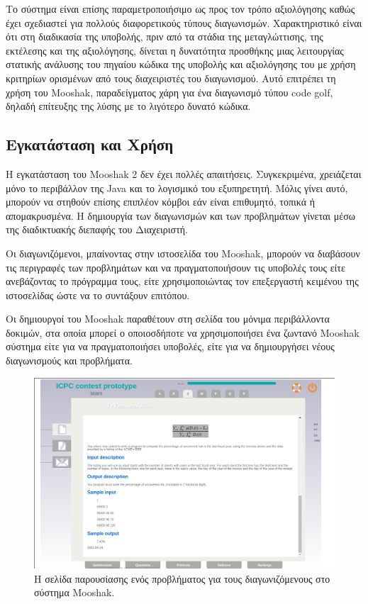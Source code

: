 \documentclass[diploma]{softlab-thesis}
\begin{document}
\bigskip

Το σύστημα είναι επίσης παραμετροποιήσιμο ως προς τον τρόπο αξιολόγησης καθώς
έχει σχεδιαστεί για πολλούς διαφορετικούς τύπους διαγωνισμών. Χαρακτηριστικό
είναι ότι στη διαδικασία της υποβολής, πριν από τα στάδια της μεταγλώττισης,
της εκτέλεσης και της αξιολόγησης, δίνεται η δυνατότητα προσθήκης μιας
λειτουργίας στατικής ανάλυσης του πηγαίου κώδικα της υποβολής και αξιολόγησης
του με χρήση κριτηρίων ορισμένων από τους διαχειριστές του διαγωνισμού. Αυτό
επιτρέπει τη χρήση του Mooshak, παραδείγματος χάρη για ένα διαγωνισμό τύπου
code golf, δηλαδή επίτευξης της λύσης με το λιγότερο δυνατό κώδικα.

\subsection{Εγκατάσταση και Χρήση}

Η εγκατάσταση του Mooshak 2 δεν έχει πολλές απαιτήσεις. Συγκεκριμένα,
χρειάζεται μόνο το περιβάλλον της Java και το λογισμικό του εξυπηρετητή. Μόλις
γίνει αυτό, μπορούν να στηθούν επίσης επιπλέον κόμβοι εάν είναι επιθυμητό,
τοπικά ή απομακρυσμένα. Η δημιουργία των διαγωνισμών και των προβλημάτων
γίνεται μέσω της διαδικτυακής διεπαφής του Διαχειριστή.

\bigskip

Οι διαγωνιζόμενοι, μπαίνοντας στην ιστοσελίδα του Mooshak, μπορούν να διαβάσουν
τις περιγραφές των προβλημάτων και να πραγματοποιήσουν τις υποβολές τους είτε
ανεβάζοντας το πρόγραμμα τους, είτε χρησιμοποιώντας τον επεξεργαστή κειμένου της
ιστοσελίδας ώστε να το συντάξουν επιτόπου.

\bigskip

Οι δημιουργοί του Mooshak παραθέτουν στη σελίδα του μόνιμα περιβάλλοντα δοκιμών,
στα οποία μπορεί ο οποιοσδήποτε να χρησιμοποιήσει ένα ζωντανό Mooshak σύστημα είτε
για να πραγματοποιήσει υποβολές, είτε για να δημιουργήσει νέους διαγωνισμούς και
προβλήματα.

\bigskip

\begin{figure}
  \centering
  \includegraphics[scale=0.45,trim=4 4 4 4,clip]{Figures/mooshakproblem.png}
  \caption[Σελίδα προβλήματος Mooshak]{Η σελίδα παρουσίασης ενός προβλήματος για τους
  διαγωνιζόμενους στο σύστημα Mooshak.}
\end{figure}
\end{document}
